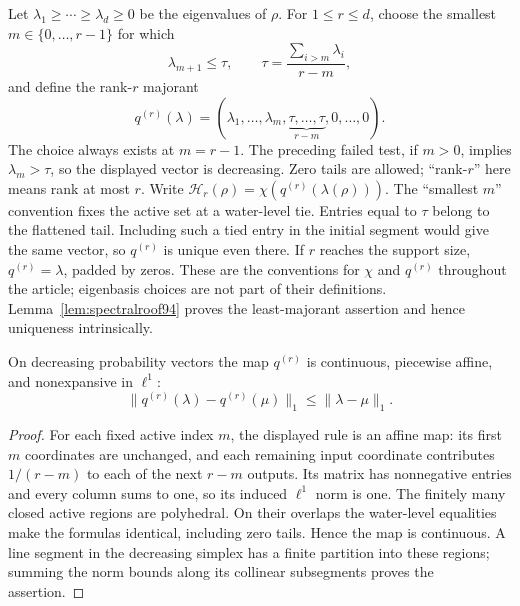 Let $\lambda_1\ge\cdots\ge\lambda_d\ge0$ be the eigenvalues of
$\rho$.  For $1\le r\le d$, choose the smallest
$m\in\{0,\ldots,r-1\}$ for which
\[
 \lambda_{m+1}\le\tau,\qquad
 \tau=\frac{\sum_{i>m}\lambda_i}{r-m},
\]
and define the rank-$r$ majorant
\begin{equation}\label{eq:rankmajorant94}
 q^{(r)}(\lambda)
   =(\lambda_1,\ldots,\lambda_m,
               \underbrace{\tau,\ldots,\tau}_{r-m},0,\ldots,0).
\end{equation}
The choice always exists at $m=r-1$.  The preceding failed test, if
$m>0$, implies $\lambda_m>\tau$, so the displayed vector is decreasing.
Zero tails are allowed; ``rank-$r$'' here means rank at most $r$.
Write $\mathcal H_r(\rho)=\chi(q^{(r)}(\lambda(\rho)))$.
The ``smallest $m$'' convention fixes the active set at a water-level
tie.  Entries equal to $\tau$ belong to the flattened tail.  Including
such a tied entry in the initial segment would give the same vector,
so $q^{(r)}$ is unique even there.  If $r$ reaches the support size,
$q^{(r)}=\lambda$, padded by zeros.  These are the conventions for
$\chi$ and $q^{(r)}$ throughout the article; eigenbasis choices are not
part of their definitions.  Lemma~\ref{lem:spectralroof94} proves the
least-majorant assertion and hence uniqueness intrinsically.

\begin{lemma}\label{lem:watermap96}
On decreasing probability vectors the map $q^{(r)}$ is continuous,
piecewise affine, and nonexpansive in $\ell^1$:
\[
 \|q^{(r)}(\lambda)-q^{(r)}(\mu)\|_1
                                     \le\|\lambda-\mu\|_1.
\]
\end{lemma}
\begin{proof}
For each fixed active index $m$, the displayed rule is an affine map:
its first $m$ coordinates are unchanged, and each remaining input
coordinate contributes $1/(r-m)$ to each of the next $r-m$ outputs.
Its matrix has nonnegative entries and every column sums to one, so
its induced $\ell^1$ norm is one.  The finitely many closed active
regions are polyhedral.  On their overlaps the water-level equalities
make the formulas identical, including zero tails.  Hence the map is
continuous.  A line segment in the decreasing simplex has a finite
partition into these regions; summing the norm bounds along its
collinear subsegments proves the assertion.
\end{proof}

